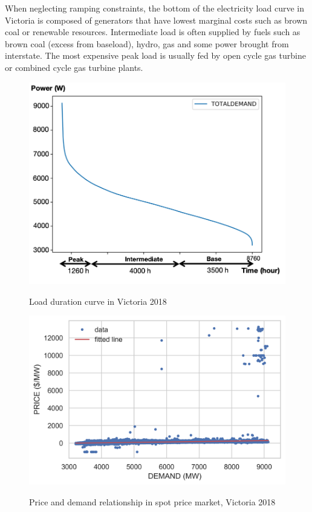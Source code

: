 \documentclass{pasa}%
\begin{document}
When neglecting ramping constraints, the bottom of the electricity load curve in Victoria is composed of generators that have lowest marginal costs such as brown coal or renewable resources. Intermediate load is often supplied by fuels such as brown coal (excess from baseload), hydro, gas and some power brought from interstate. The most expensive peak load is usually fed by open cycle gas turbine or combined cycle gas turbine plants.
\begin{figure}
\begin{center}
\includegraphics[width=.7\textwidth,height=.28\textheight,keepaspectratio]{DR/PASA_example/Figures_DR/loaddurationcurve_2018.png}
\caption{Load duration curve in Victoria 2018}\label{fig:Fig3-loadcurve}
\includegraphics[width=.7\textwidth,height=.23\textheight,keepaspectratio]{DR/PASA_example/Figures_DR/price2018.png}
\caption{Price and demand relationship in spot price market, Victoria 2018}\label{fig:Fig4-pricedemand}
\end{center}
\end{figure}
\end{document}
